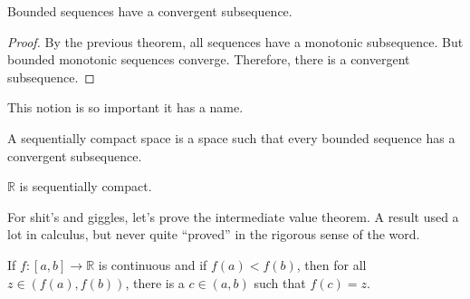 \documentclass[crop=false,class=article,oneside]{standalone}
\begin{document}
            \begin{theorem}
                Bounded sequences have a convergent subsequence.
            \end{theorem}
            \begin{proof}
                By the previous theorem, all sequences have a
                monotonic subsequence. But bounded monotonic
                sequences converge. Therefore,
                there is a convergent subsequence.
            \end{proof}
            This notion is so important it has a name.
            \begin{definition}
                A sequentially compact space is a space such that
                every bounded sequence has a convergent subsequence.
            \end{definition}
            \begin{theorem}
                $\mathbb{R}$ is sequentially compact.
            \end{theorem}
            For shit's and giggles, let's prove the intermediate
            value theorem. A result used a lot in calculus, but
            never quite ``proved'' in the rigorous sense of the word.
            \begin{theorem}
                If $f:[a,b]\rightarrow\mathbb{R}$ is continuous and
                if $f(a)<f(b)$, then for all $z\in(f(a),f(b))$,
                there is a $c\in(a,b)$ such that $f(c)=z$.
            \end{theorem}
\end{document}

